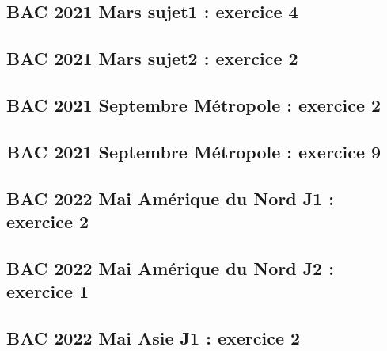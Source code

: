 \documentclass[lang=fr,edition=teacher,layout=sheet]{mxbook}
\begin{document}
\begingroup\endgroup
\par\bigskip
{}\subsection*{BAC 2021 Mars sujet1 : exercice 4}
\begingroup\endgroup
\par\bigskip
{}\subsection*{BAC 2021 Mars sujet2 : exercice 2}
\begingroup\endgroup
\par\bigskip
{}\subsection*{BAC 2021 Septembre Métropole : exercice 2}
\begingroup\endgroup
\par\bigskip
{}\subsection*{BAC 2021 Septembre Métropole : exercice 9}
\begingroup\endgroup
\par\bigskip
{}\subsection*{BAC 2022 Mai Amérique du Nord J1 : exercice 2}
\begingroup\endgroup
\par\bigskip
{}\subsection*{BAC 2022 Mai Amérique du Nord J2 : exercice 1}
\begingroup\endgroup
\par\bigskip
{}\subsection*{BAC 2022 Mai Asie J1 : exercice 2}
\end{document}
